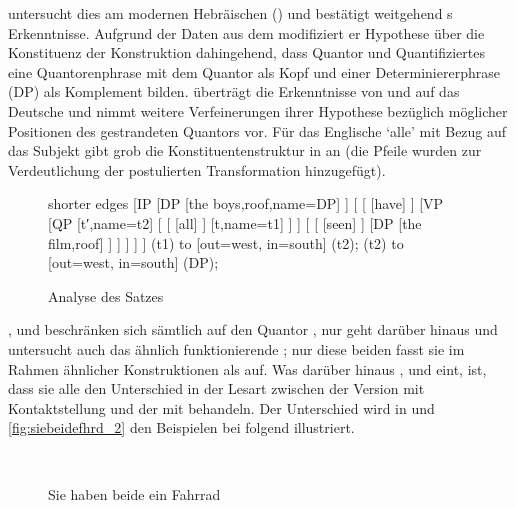 \citet{shlonsky1991} untersucht dies am modernen Hebräischen () und
bestätigt weitgehend \citeauthor{sportiche1988}s Erkenntnisse. Aufgrund der
Daten aus dem  modifiziert er  Hypothese
über die Konstituenz der Konstruktion dahingehend, dass Quantor und
Quantifiziertes eine Quantorenphrase mit dem Quantor als Kopf und einer
Determiniererphrase (DP) als Komplement bilden.
\citet{merchant1996} überträgt die Erkenntnisse von \citet{sportiche1988} und
\citet{shlonsky1991} auf das Deutsche und nimmt weitere
Verfeinerungen ihrer Hypothese bezüglich möglicher Positionen des gestrandeten
Quantors vor. Für das Englische  `alle' mit Bezug auf das
Subjekt gibt \citet{merchant1996} grob die Konstituentenstruktur in
 an (die Pfeile wurden zur Verdeutlichung der postulierten
Transformation hinzugefügt).

\begin{figure}
	\begin{forest} shorter edges
	[IP
		[DP
			[{the boys},roof,name=DP]
		]
		[
			[
				[have]
			]
			[VP
				[QP
					[t′,name=t2]
					[
						[
							[all]
						]
						[t,name=t1]
					]
				]
				[
					[
						[seen]
					]
					[DP
						[{the film},roof]
					]
				]
			]
		]
	]
	 (t1) to [out=west, in=south] (t2);
	 (t2) to [out=west, in=south] (DP);
	\end{forest}
	\caption{Analyse des Satzes 
	\autocite[nach][180]{merchant1996}}
	\label{fig:qfgg}
\end{figure}

\citet{sportiche1988}, \citet{shlonsky1991} und \citet{merchant1996}
beschränken sich sämtlich auf den Quantor , nur \citet{pittner1995}
geht darüber hinaus und untersucht auch das ähnlich funktionierende ;
nur diese beiden fasst sie im Rahmen ähnlicher Konstruktionen als  auf. Was darüber hinaus \citeauthor{shlonsky1991},
\citeauthor{pittner1995} und \citeauthor{merchant1996} eint, ist, dass sie alle
den Unterschied in der Lesart zwischen der Version mit Kontaktstellung und der
mit  behandeln. Der Unterschied wird in
 und \ref{fig:siebeidefhrd_2} den Beispielen bei
\citet[30--31]{pittner1995} folgend illustriert.

\begin{figure}
\\
\caption{Sie haben beide ein Fahrrad}
\label{fig:siebeidefhrd_1}
\end{figure}

